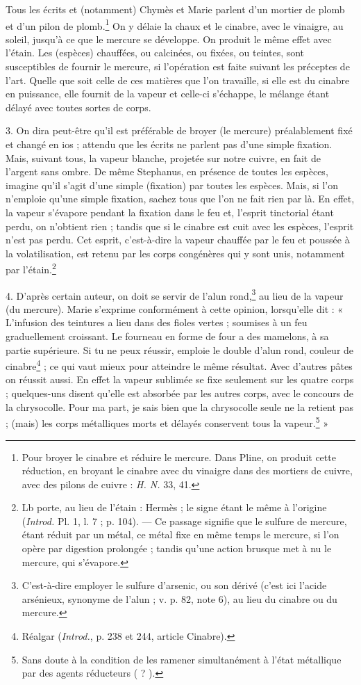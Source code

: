 \documentclass[landscape, a4paper, 11pt, oneside, polutonikogreek, french]{article}
\begin{document}
Tous les écrits et (notamment) Chymès et Marie parlent d'un mortier de plomb et d'un pilon de plomb.\footnote{Pour broyer le cinabre et réduire le mercure. Dans Pline, on produit cette réduction, en broyant le cinabre avec du vinaigre dans des mortiers de cuivre, avec des pilons de cuivre : \emph{H. N.} 33, 41.} On y délaie la chaux et le cinabre, avec le vinaigre, au soleil, jusqu'à ce que le mercure se développe. On produit le même effet avec l'étain. Les (espèces) chauffées, ou calcinées, ou fixées, ou teintes, sont susceptibles de fournir le mercure, si l'opération est faite suivant les préceptes de l'art. Quelle que soit celle de ces matières que l'on travaille, si elle est du cinabre en puissance, elle fournit de la vapeur et celle-ci s'échappe, le mélange étant délayé avec toutes sortes de corps.

3. On dira peut-être qu'il est préférable de broyer (le mercure) préalablement fixé et changé en ios ; attendu que les écrits ne parlent pas d'une simple fixation. Mais, suivant tous, la vapeur blanche, projetée sur notre cuivre, en fait de l'argent sans ombre. De même Stephanus, en présence de toutes les espèces, imagine qu'il s'agit d'une simple (fixation) par toutes les espèces. Mais, si l'on n'emploie qu'une simple fixation, sachez tous que l'on ne fait rien par là. En effet, la vapeur s'évapore pendant la fixation dans le feu et, l'esprit tinctorial étant perdu, on n'obtient rien ; tandis que si le cinabre est cuit avec les espèces, l'esprit n'est pas perdu. Cet esprit, c'est-à-dire la vapeur chauffée par le feu et poussée à la volatilisation, est retenu par les corps congénères qui y sont unis, notamment par l'étain.\footnote{Lb porte, au lieu de l'étain : Hermès ; le signe étant le même à l'origine (\emph{Introd.} Pl. 1, l. 7 ; p. 104). --- Ce passage signifie que le sulfure de mercure, étant réduit par un métal, ce métal fixe en même temps le mercure, si l'on opère par digestion prolongée ; tandis qu'une action brusque met à nu le mercure, qui s'évapore.}

4. D'après certain auteur, on doit se servir de l'alun rond,\footnote{C'est-à-dire employer le sulfure d'arsenic, ou son dérivé (c'est ici l'acide arsénieux, synonyme de l'alun ; v. p. 82, note 6), au lieu du cinabre ou du mercure.} au lieu de la vapeur (du mercure). Marie s'exprime conformément à cette opinion, lorsqu'elle dit : « L'infusion des teintures a lieu dans des fioles vertes ; soumises à un feu graduellement croissant. Le fourneau en forme de four a des mamelons, à sa partie supérieure. Si tu ne peux réussir, emploie le double d'alun rond, couleur de cinabre\footnote{Réalgar (\emph{Introd.}, p. 238 et 244, article Cinabre).} ; ce qui vaut mieux pour atteindre le même résultat. Avec d'autres pâtes on réussit aussi. En effet la vapeur sublimée se fixe seulement sur les quatre corps ; quelques-uns disent qu'elle est absorbée par les autres corps, avec le concours de la chrysocolle. Pour ma part, je sais bien que la chrysocolle seule ne la retient pas ; (mais) les corps métalliques morts et délayés conservent tous la vapeur.\footnote{Sans doute à la condition de les ramener simultanément à l'état métallique par des agents réducteurs ( ? ).} »
\end{document}
